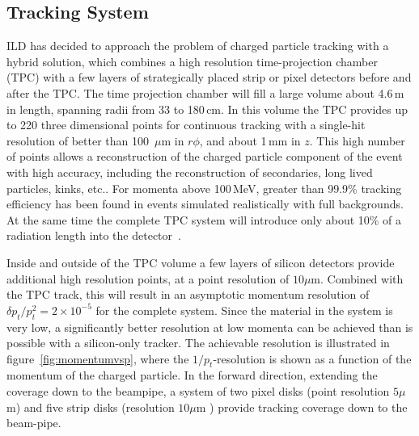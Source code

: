 \documentclass[%
 amsmath,amssymb,
 aps,
 longbibliography,
]{revtex4-1}
\begin{document}
\subsection{Tracking System}

 ILD has decided to approach the problem of charged particle tracking with a hybrid solution, which combines a high resolution time-projection chamber (TPC) with a few layers of strategically placed strip or pixel detectors before and after the TPC. 
The time projection chamber will fill a large volume about 4.6\,m in length, spanning radii from 33 to 180\,cm. In this volume the TPC provides up to 220 three dimensional points for continuous tracking with a single-hit resolution of better than 100~$\mu\mathrm{m}$ in $r \phi$, and about 1\,mm in $z$. This high number of points allows a reconstruction of the charged particle component of the event with high accuracy, including the reconstruction of secondaries, long lived particles, kinks, etc.. For momenta above 100\,MeV, greater than 99.9\% tracking efficiency has been found in events simulated realistically with full backgrounds. At the same time the complete TPC system will introduce only about 10\% of a radiation length into the detector~\cite{Diener:2012mc}. 

Inside and outside of the TPC volume a few layers of silicon detectors provide additional high resolution points, at a point resolution of $10\mu \mathrm{m}$. Combined with the TPC track, this will result in an asymptotic momentum resolution of $\delta p_t / p_t^2 = 2 \times 10^{-5}$ for the complete system. Since the material in the system is very low, a significantly better resolution at low momenta can be achieved than is possible with a silicon-only tracker. The achievable resolution is illustrated in figure~\ref{fig:momentumvsp}, where the $1/p_t$-resolution is shown as a function of the momentum of the charged particle. In the forward direction, extending the coverage down to the beampipe, a system of two pixel disks (point resolution $5 \mu$m) and five strip disks (resolution $10 \mu$m ) provide tracking coverage down to the beam-pipe.
\end{document}
